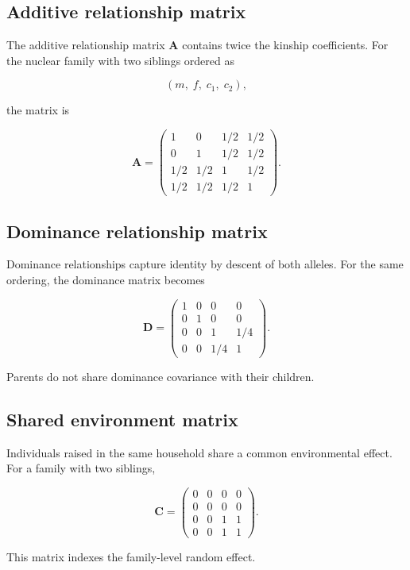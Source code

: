 \documentclass[11pt]{article}
\begin{document}
\subsection{Additive relationship matrix}

The additive relationship matrix $\mathbf{A}$ contains twice the kinship 
coefficients. For the nuclear family with two siblings ordered as

\[
(m,\; f,\; c_1,\; c_2),
\]

the matrix is

\[
\mathbf{A} =
\begin{pmatrix}
1 & 0 & 1/2 & 1/2 \\
0 & 1 & 1/2 & 1/2 \\
1/2 & 1/2 & 1 & 1/2 \\
1/2 & 1/2 & 1/2 & 1
\end{pmatrix}.
\]

\subsection{Dominance relationship matrix}

Dominance relationships capture identity by descent of both alleles.  
For the same ordering, the dominance matrix becomes

\[
\mathbf{D} =
\begin{pmatrix}
1 & 0 & 0 & 0 \\
0 & 1 & 0 & 0 \\
0 & 0 & 1 & 1/4 \\
0 & 0 & 1/4 & 1
\end{pmatrix}.
\]

Parents do not share dominance covariance with their children.

\subsection{Shared environment matrix}

Individuals raised in the same household share a common environmental effect.  
For a family with two siblings,

\[
\mathbf{C} =
\begin{pmatrix}
0 & 0 & 0 & 0 \\
0 & 0 & 0 & 0 \\
0 & 0 & 1 & 1 \\
0 & 0 & 1 & 1
\end{pmatrix}.
\]

This matrix indexes the family-level random effect.
\end{document}
